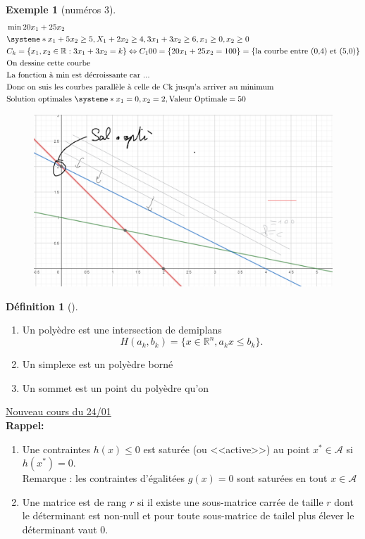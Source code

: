 \documentclass{article}
\theoremstyle{plain}%
\theoremstyle{definition}
\newtheorem{defn}{Définition}[section]
\newtheorem{exmp}{Exemple}[section]
\theoremstyle{remark}
\begin{document}
\begin{exmp}[numéros 3]
    \begin{align*}
        &\min 20x_1 + 25x_2 \\
        &\systeme*{
            x_1 + 5 x_2 \geq 5, 
            X_1 + 2x_2 \geq 4,
            3x_1 + 3x_2 \geq 6,
            x_1 \geq 0, 
            x_2 \geq 0
        } \\
        &C_k = \{x_1,x_2 \in \mathbb{R} : 3x_1 + 3 x_2 = k \} \Leftrightarrow C_100 = \{20 x_1 + 25x_2 = 100\} = \{\text{la courbe entre (0,4) et (5,0)}\} \\
        &\text{On dessine cette courbe} \\
        &\text{La fonction à min est décroissante car ...} \\
        &\text{Donc on suis les courbes parallèle à celle de Ck jusqu'a arriver au minimum} \\
        &\text{Solution optimales } \systeme*{x_1 = 0, x_2 = 2}, \text{Valeur Optimale} = 50
    \end{align*}
    \begin{figure}[!htbp]
        \centering
        \includegraphics[width=.75\textwidth]{fig1.png}
    \end{figure}
\end{exmp}

\begin{defn}[]
    \begin{enumerate}
        \item Un polyèdre est une intersection de demiplans 
        \[
            H(a_k, b_k) = \{x \in \mathbb{R}^n, a_k x \leq  b_k\}
        .\]
        \item Un simplexe est un polyèdre borné 
        \item Un sommet est un point du polyèdre qu'on 
    \end{enumerate}
\end{defn}

\underline{Nouveau cours du 24/01} \\
\textbf{Rappel:}
\begin{enumerate}
    \item Une contraintes $ h(x) \leq 0 $ est saturée (ou <<active>>) au point $ x^* \in \mathcal{A} $ si $ h(x^*) = 0 $. \\
    Remarque : les contraintes d'égalitées $ g(x) = 0 $ sont saturées en tout $ x \in \mathcal{A} $
    \item Une matrice est de rang $ r $ si il existe une sous-matrice carrée de taille $ r $ dont le déterminant est non-null et pour toute sous-matrice de tailel plus élever le déterminant vaut 0. 
\end{enumerate}
\end{document}
